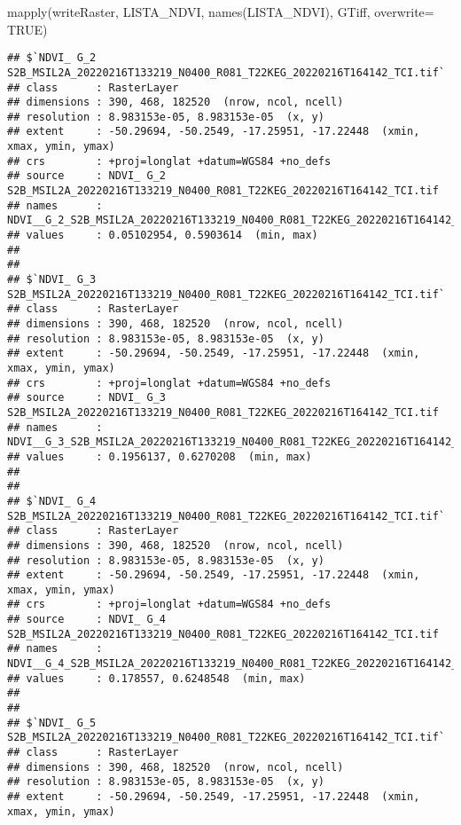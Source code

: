 \documentclass[
]{article}
\newenvironment{Shaded}{\begin{snugshade}}{\end{snugshade}}
\newcommand{\AttributeTok}[1]{\textcolor[rgb]{0.77,0.63,0.00}{#1}}
\newcommand{\ConstantTok}[1]{\textcolor[rgb]{0.00,0.00,0.00}{#1}}
\newcommand{\FunctionTok}[1]{\textcolor[rgb]{0.00,0.00,0.00}{#1}}
\newcommand{\NormalTok}[1]{#1}
\newcommand{\StringTok}[1]{\textcolor[rgb]{0.31,0.60,0.02}{#1}}
\begin{document}
\begin{Shaded}
\begin{Highlighting}[]
\FunctionTok{mapply}\NormalTok{(writeRaster, LISTA\_NDVI, }\FunctionTok{names}\NormalTok{(LISTA\_NDVI), }\StringTok{\textquotesingle{}GTiff\textquotesingle{}}\NormalTok{, }\AttributeTok{overwrite=} \ConstantTok{TRUE}\NormalTok{)}
\end{Highlighting}
\end{Shaded}

\begin{verbatim}
## $`NDVI_ G_2 S2B_MSIL2A_20220216T133219_N0400_R081_T22KEG_20220216T164142_TCI.tif`
## class      : RasterLayer 
## dimensions : 390, 468, 182520  (nrow, ncol, ncell)
## resolution : 8.983153e-05, 8.983153e-05  (x, y)
## extent     : -50.29694, -50.2549, -17.25951, -17.22448  (xmin, xmax, ymin, ymax)
## crs        : +proj=longlat +datum=WGS84 +no_defs 
## source     : NDVI_ G_2 S2B_MSIL2A_20220216T133219_N0400_R081_T22KEG_20220216T164142_TCI.tif 
## names      : NDVI__G_2_S2B_MSIL2A_20220216T133219_N0400_R081_T22KEG_20220216T164142_TCI 
## values     : 0.05102954, 0.5903614  (min, max)
## 
## 
## $`NDVI_ G_3 S2B_MSIL2A_20220216T133219_N0400_R081_T22KEG_20220216T164142_TCI.tif`
## class      : RasterLayer 
## dimensions : 390, 468, 182520  (nrow, ncol, ncell)
## resolution : 8.983153e-05, 8.983153e-05  (x, y)
## extent     : -50.29694, -50.2549, -17.25951, -17.22448  (xmin, xmax, ymin, ymax)
## crs        : +proj=longlat +datum=WGS84 +no_defs 
## source     : NDVI_ G_3 S2B_MSIL2A_20220216T133219_N0400_R081_T22KEG_20220216T164142_TCI.tif 
## names      : NDVI__G_3_S2B_MSIL2A_20220216T133219_N0400_R081_T22KEG_20220216T164142_TCI 
## values     : 0.1956137, 0.6270208  (min, max)
## 
## 
## $`NDVI_ G_4 S2B_MSIL2A_20220216T133219_N0400_R081_T22KEG_20220216T164142_TCI.tif`
## class      : RasterLayer 
## dimensions : 390, 468, 182520  (nrow, ncol, ncell)
## resolution : 8.983153e-05, 8.983153e-05  (x, y)
## extent     : -50.29694, -50.2549, -17.25951, -17.22448  (xmin, xmax, ymin, ymax)
## crs        : +proj=longlat +datum=WGS84 +no_defs 
## source     : NDVI_ G_4 S2B_MSIL2A_20220216T133219_N0400_R081_T22KEG_20220216T164142_TCI.tif 
## names      : NDVI__G_4_S2B_MSIL2A_20220216T133219_N0400_R081_T22KEG_20220216T164142_TCI 
## values     : 0.178557, 0.6248548  (min, max)
## 
## 
## $`NDVI_ G_5 S2B_MSIL2A_20220216T133219_N0400_R081_T22KEG_20220216T164142_TCI.tif`
## class      : RasterLayer 
## dimensions : 390, 468, 182520  (nrow, ncol, ncell)
## resolution : 8.983153e-05, 8.983153e-05  (x, y)
## extent     : -50.29694, -50.2549, -17.25951, -17.22448  (xmin, xmax, ymin, ymax)

\end{verbatim}
\end{document}
